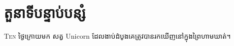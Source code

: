 \chapter{តួនាទី​បន្ទាប់បន្សំ}

\lettrine{T}{en} ថ្ងៃក្រោយមក សត្វ Unicorn ដែលងាប់ដំបូងគេត្រូវបានរកឃើញនៅក្នុងព្រៃហាមឃាត់។
